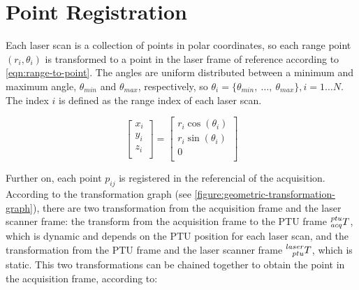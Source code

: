 \section{Point Registration}
\label{section:point-registration}

Each laser scan is a collection of points in polar coordinates, so each range point $(r_i, \theta_i)$ is transformed to a point in the laser frame of reference according to \cref{eqn:range-to-point}. The angles are uniform distributed between a minimum and maximum angle, $\theta_{min}$ and $\theta_{max}$, respectively, so $\theta_i = \{\theta_{min}, \ \dots, \ \theta_{max}\}, i=1 \dots N$. The index $i$ is defined as the range index of each laser scan.

\begin{equation}\label{eqn:range-to-point}
    \left[
        \begin{array}{c}
            x_i \\
            y_i \\
            z_i \\
        \end{array}
    \right]
    =
    \left[
        \begin{array}{c}
            r_i \cos(\theta_i) \\
            r_i \sin(\theta_i) \\
            0 \\
        \end{array}    
    \right]
\end{equation}

Further on, each point $p_{ij}$ is registered in the referencial of the acquisition. According to the transformation graph (see \cref{figure:geometric-transformation-graph}), there are two transformation from the acquisition frame and the laser scanner frame: the transform from the acquisition frame to the PTU frame $\TF{acq}{ptu}$, which is dynamic and depends on the PTU position for each laser scan, and the transformation from the PTU frame and the laser scanner frame $\TF{ptu}{laser}$, which is static. This two transformations can be chained together to obtain the point in the acquisition frame, according to:


